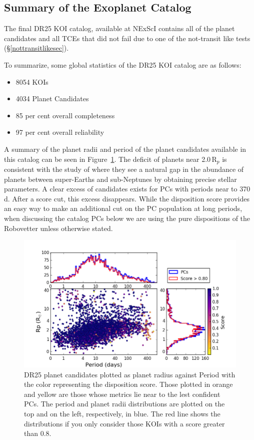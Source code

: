 \subsection{Summary of the Exoplanet Catalog}

The final DR25 KOI catalog, available at NExScI contains all of the planet candidates and all TCEs that did not fail due to one of the not-transit like tests (\S\ref{nottransitlikesec}). 


To summarize, some global statistics of the DR25 KOI catalog are as follows:
\begin{itemize}
    \item 8054 KOIs
    \item 4034 Planet Candidates
    \item 85 per cent overall completeness
    \item 97 per cent overall reliability
\end{itemize}


A summary of the planet radii and period of the planet candidates available in this catalog can be seen in Figure~\ref{f:catalogPlot}. The deficit of planets near 2.0\,R$_{p}$ is consistent with the study of \citet{Fulton2017} where they see a natural gap in the abundance of planets between super-Earths and sub-Neptunes by obtaining precise stellar parameters. A clear excess of candidates exists for PCs with periods near to 370\,d.  After a score cut, this excess disappears. While the disposition score provides an easy way to make an additional cut on the PC population at long periods, when discussing the catalog PCs below we are using the pure dispositions of the Robovetter unless otherwise stated. 

\begin{figure}
    \centering
    \includegraphics[width=1.1\linewidth]{fig-radiusPeriodScore-hist.png}
    \caption{DR25 planet candidates plotted as planet radius against Period with the color representing the disposition score. Those plotted in orange and yellow are those whose metrics lie near to the lest confident PCs.  The period and planet radii distributions are plotted on the top and on the left, respectively, in blue. The red line shows the distributions if you only consider those KOIs with a score greater than 0.8. }
    \label{f:catalogPlot}
\end{figure}





